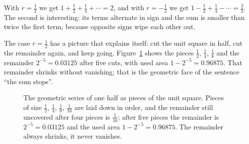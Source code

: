 With $r = \tfrac{1}{2}$ we get $1 + \tfrac{1}{2} + \tfrac{1}{4} + \cdots = 2$, and with
$r = -\tfrac{1}{2}$ we get $1 - \tfrac{1}{2} + \tfrac{1}{4} - \cdots = \tfrac{2}{3}$. The
second is interesting: its terms alternate in sign and the sum is smaller than twice the
first term, because opposite signs wipe each other out.

The case $r=\tfrac{1}{2}$ has a picture that explains itself: cut the unit square in half,
cut the remainder again, and keep going. Figure~\ref{fig:potong-geometri} shows the pieces
$\tfrac12$, $\tfrac14$, $\tfrac18$ and the remainder $2^{-5} = 0.03125$ after five cuts,
with used area $1 - 2^{-5} = 0.96875$. That remainder shrinks without vanishing; that is
the geometric face of the sentence ``the sum stops''.

\begin{figure}[htbp]
\centering
{}
\caption{The geometric series of one half as pieces of the unit square. Pieces of size
$\tfrac12$, $\tfrac14$, $\tfrac18$, $\tfrac1{16}$ are laid down in order, and the
remainder still uncovered after four pieces is $\tfrac1{16}$; after five pieces the
remainder is $2^{-5} = 0.03125$ and the used area $1 - 2^{-5} = 0.96875$. The remainder
always shrinks, it never vanishes.}
\label{fig:potong-geometri}
\end{figure}


